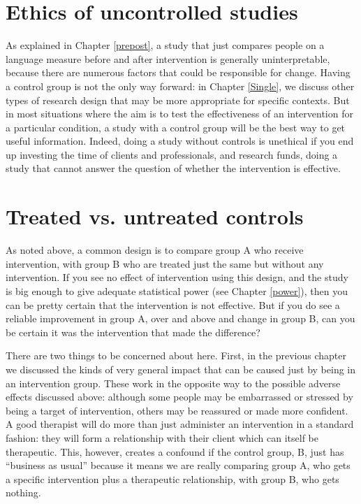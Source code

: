 \documentclass{krantz}
\begin{document}
\hypertarget{ethics-of-uncontrolled-studies}{%
\section{Ethics of uncontrolled studies}\label{ethics-of-uncontrolled-studies}}

As explained in Chapter \ref{prepost}, a study that just compares people on a language measure before and after intervention is generally uninterpretable, because there are numerous factors that could be responsible for change. Having a control group is not the only way forward: in Chapter \ref{Single}, we discuss other types of research design that may be more appropriate for specific contexts. But in most situations where the aim is to test the effectiveness of an intervention for a particular condition, a study with a control group will be the best way to get useful information. Indeed, doing a study without controls is unethical if you end up investing the time of clients and professionals, and research funds, doing a study that cannot answer the question of whether the intervention is effective.

\hypertarget{treated-vs-untreated-controls}{%
\section{Treated vs. untreated controls}\label{treated-vs-untreated-controls}}

As noted above, a common design is to compare group A who receive intervention, with group B who are treated just the same but without any intervention. If you see no effect of intervention using this design, and the study is big enough to give adequate statistical power (see Chapter \ref{power}), then you can be pretty certain that the intervention is not effective. But if you do see a reliable improvement in group A, over and above and change in group B, can you be certain it was the intervention that made the difference?

There are two things to be concerned about here. First, in the previous chapter we discussed the kinds of very general impact that can be caused just by being in an intervention group. These work in the opposite way to the possible adverse effects discussed above: although some people may be embarrassed or stressed by being a target of intervention, others may be reassured or made more confident. A good therapist will do more than just administer an intervention in a standard fashion: they will form a relationship with their client which can itself be therapeutic. This, however, creates a confound if the control group, B, just has ``business as usual'' because it means we are really comparing group A, who gets a specific intervention plus a therapeutic relationship, with group B, who gets nothing.
\end{document}

